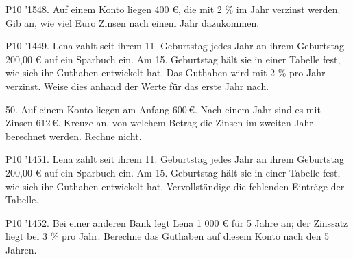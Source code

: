 \documentclass[11pt]{article}
\begin{document}
\begin{pfaufg}{P10 ’15}{48.}{}
Auf einem Konto liegen 400 €, die mit 2 \% im Jahr verzinst werden. Gib an, wie viel Euro Zinsen nach einem Jahr dazukommen.
\end{pfaufg}
\pfgruppe{}
\begin{pfaufg}{P10 ’14}{49.}{}
Lena zahlt seit ihrem 11. Geburtstag jedes Jahr an ihrem Geburtstag 200,00 € auf ein Sparbuch ein. Am 15. Geburtstag hält sie in einer Tabelle fest, wie sich ihr Guthaben entwickelt hat. Das Guthaben wird mit 2 \% pro Jahr verzinst. Weise dies anhand der Werte für das erste Jahr nach.
\par\smallskip\noindent {}\par
{}
\end{pfaufg}
\pfgruppe{}
\begin{pfaufg}{}{50.}{}
Auf einem Konto liegen am Anfang 600\,€. Nach einem Jahr sind es mit Zinsen 612\,€. Kreuze an, von welchem Betrag die Zinsen im zweiten Jahr berechnet werden. Rechne nicht. 
\end{pfaufg}
\pfgruppe{}
\begin{pfaufg}{P10 ’14}{51.}{}
Lena zahlt seit ihrem 11. Geburtstag jedes Jahr an ihrem Geburtstag 200,00 € auf ein Sparbuch ein. Am 15. Geburtstag hält sie in einer Tabelle fest, wie sich ihr Guthaben entwickelt hat. Vervollständige die fehlenden Einträge der Tabelle.
\par\smallskip\noindent {}\par
{}
\end{pfaufg}
\pfgruppe{}
\begin{pfaufg}{P10 ’14}{52.}{}
Bei einer anderen Bank legt Lena 1 000 € für 5 Jahre an; der Zinssatz liegt bei 3 \% pro Jahr. Berechne das Guthaben auf diesem Konto nach den 5 Jahren.
\end{pfaufg}
\end{document}
